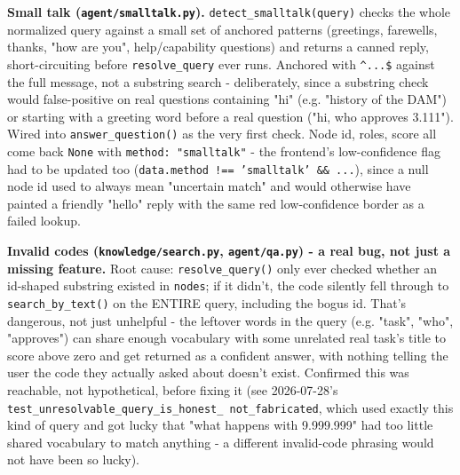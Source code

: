\textbf{Small talk (\texttt{agent/\allowbreak{}smalltalk.py}).} \texttt{detect\_\allowbreak{}smalltalk(query)} checks the whole normalized query against a small set of anchored patterns (greetings, farewells, thanks, "how are you", help/capability questions) and returns a canned reply, short-circuiting before \texttt{resolve\_\allowbreak{}query} ever runs. Anchored with \texttt{\textasciicircum{}...\$} against the full message, not a substring search - deliberately, since a substring check would false-positive on real questions containing "hi" (e.g. "history of the DAM") or starting with a greeting word before a real question ("hi, who approves 3.111"). Wired into \texttt{answer\_\allowbreak{}question()} as the very first check. Node id, roles, score all come back \texttt{None} with \texttt{method: "smalltalk"} - the frontend's low-confidence flag had to be updated too (\texttt{data.method !== 'smalltalk' \&\& ...}), since a null node id used to always mean "uncertain match" and would otherwise have painted a friendly "hello" reply with the same red low-confidence border as a failed lookup.

\textbf{Invalid codes (\texttt{knowledge/\allowbreak{}search.py}, \texttt{agent/\allowbreak{}qa.py}) - a real bug, not just a missing feature.} Root cause: \texttt{resolve\_\allowbreak{}query()} only ever checked whether an id-shaped substring existed in \texttt{nodes}; if it didn't, the code silently fell through to \texttt{search\_\allowbreak{}by\_\allowbreak{}text()} on the ENTIRE query, including the bogus id. That's dangerous, not just unhelpful - the leftover words in the query (e.g. "task", "who", "approves") can share enough vocabulary with some unrelated real task's title to score above zero and get returned as a confident answer, with nothing telling the user the code they actually asked about doesn't exist. Confirmed this was reachable, not hypothetical, before fixing it (see 2026-07-28's \texttt{test\_\allowbreak{}unresolvable\_\allowbreak{}query\_\allowbreak{}is\_\allowbreak{}honest\_\allowbreak{} not\_\allowbreak{}fabricated}, which used exactly this kind of query and got lucky that "what happens with 9.999.999" had too little shared vocabulary to match anything - a different invalid-code phrasing would not have been so lucky).

